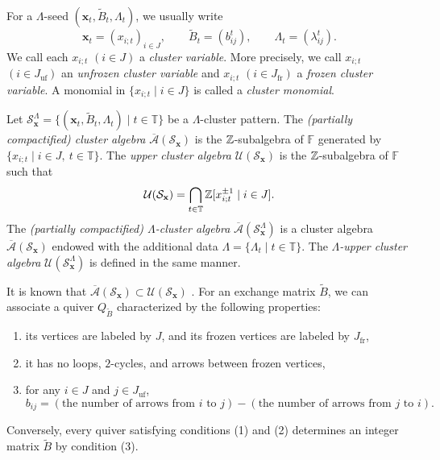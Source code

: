 For a $\Lambda$-seed $(\mathbf{x}_t, \widetilde{B}_t, \Lambda_t)$,
we usually write
\[
\mathbf{x}_t = (x_{i;t})_{i \in J},
\qquad
\widetilde{B}_t = (b_{ij}^{t}),
\qquad
\Lambda_t = (\lambda_{ij}^{t}).
\]
We call each $x_{i;t}$ $(i \in J)$ a \emph{cluster variable}.
More precisely, we call $x_{i;t}$ $(i \in J_{\mathrm{uf}})$
an \emph{unfrozen cluster variable} and
$x_{i;t}$ $(i \in J_{\mathrm{fr}})$ a \emph{frozen cluster variable}.
A monomial in $\{x_{i;t} \mid i \in J\}$
is called a \emph{cluster monomial}.

\begin{Def}
\label{Def : cluster algebras}
Let
$\mathcal{S}_{\mathbf{x}}^{\Lambda}
= \{(\mathbf{x}_t, \widetilde{B}_t, \Lambda_t)
\mid t \in \mathbb{T}\}$
be a $\Lambda$-cluster pattern.
The \emph{(partially compactified) cluster algebra}
$\overline{\mathcal{A}}(\mathcal{S}_{\mathbf{x}})$
is the $\mathbb{Z}$-subalgebra of $\mathbb{F}$
generated by $\{x_{i;t} \mid i \in J,\ t \in \mathbb{T}\}$.
The \emph{upper cluster algebra}
$\mathcal{U}(\mathcal{S}_{\mathbf{x}})$
is the $\mathbb{Z}$-subalgebra of $\mathbb{F}$ such that
\[
\mathcal{U}(\mathcal{S}_{\mathbf{x}})
= \bigcap_{t \in \mathbb{T}}
\mathbb{Z}[x_{i;t}^{\pm 1} \mid i \in J].
\]
The \emph{(partially compactified) $\Lambda$-cluster algebra}
$\overline{\mathcal{A}}(\mathcal{S}_{\mathbf{x}}^{\Lambda})$
is a cluster algebra
$\overline{\mathcal{A}}(\mathcal{S}_{\mathbf{x}})$
endowed with the additional data
$\Lambda = \{\Lambda_t \mid t \in \mathbb{T}\}$.
The \emph{$\Lambda$-upper cluster algebra}
$\mathcal{U}(\mathcal{S}_{\mathbf{x}}^{\Lambda})$
is defined in the same manner.
\end{Def}

It is known that
$\overline{\mathcal{A}}(\mathcal{S}_{\mathbf{x}})
\subset \mathcal{U}(\mathcal{S}_{\mathbf{x}})$ \cite{FZ02}.
For an exchange matrix $\widetilde{B}$,
we can associate a quiver $Q_{\widetilde{B}}$
characterized by the following properties:
\begin{enumerate}
    \item[(1)] its vertices are labeled by $J$,
    and its frozen vertices are labeled by $J_{\mathrm{fr}}$,
    \item[(2)] it has no loops, $2$-cycles,
    and arrows between frozen vertices,
    \item[(3)] for any $i \in J$ and $j \in J_{\mathrm{uf}}$,
    \[
    b_{ij}
    = (\text{the number of arrows from $i$ to $j$})
    - (\text{the number of arrows from $j$ to $i$}).
    \]
\end{enumerate}
Conversely, every quiver satisfying conditions (1) and (2)
determines an integer matrix $\widetilde{B}$ by condition (3). 

